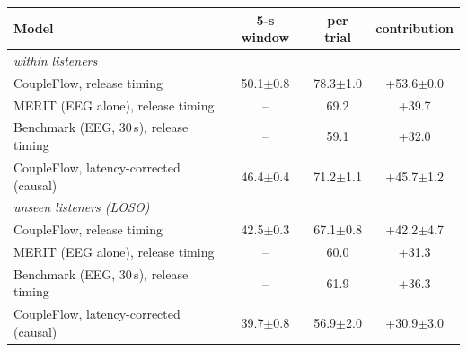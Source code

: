 \begin{tabular}{lccc}\toprule
Model & 5-s window & per trial & contribution \\\midrule
\multicolumn{4}{l}{\emph{within listeners}} \\
CoupleFlow, release timing & 50.1{\scriptsize$\pm$0.8} & 78.3{\scriptsize$\pm$1.0} & +53.6{\scriptsize$\pm$0.0} \\
MERIT (EEG alone), release timing & -- & 69.2 & +39.7 \\
Benchmark (EEG, 30\,s), release timing & -- & 59.1 & +32.0 \\
CoupleFlow, latency-corrected (causal) & 46.4{\scriptsize$\pm$0.4} & 71.2{\scriptsize$\pm$1.1} & +45.7{\scriptsize$\pm$1.2} \\
\multicolumn{4}{l}{\emph{unseen listeners (LOSO)}} \\
CoupleFlow, release timing & 42.5{\scriptsize$\pm$0.3} & 67.1{\scriptsize$\pm$0.8} & +42.2{\scriptsize$\pm$4.7} \\
MERIT (EEG alone), release timing & -- & 60.0 & +31.3 \\
Benchmark (EEG, 30\,s), release timing & -- & 61.9 & +36.3 \\
CoupleFlow, latency-corrected (causal) & 39.7{\scriptsize$\pm$0.8} & 56.9{\scriptsize$\pm$2.0} & +30.9{\scriptsize$\pm$3.0} \\
\bottomrule\end{tabular}
